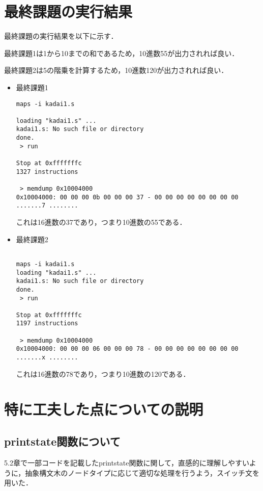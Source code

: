 \documentclass[a4j]{jarticle}
\begin{document}
\section{最終課題の実行結果}
最終課題の実行結果を以下に示す．

最終課題1は1から10までの和であるため，10進数55が出力されれば良い．

最終課題2は5の階乗を計算するため，10進数120が出力されれば良い．

\begin{itemize}

\item 最終課題1
\begin{screen}
\begin{verbatim}
maps -i kadai1.s

loading "kadai1.s" ...
kadai1.s: No such file or directory
done.
 > run

Stop at 0xfffffffc
1327 instructions

 > memdump 0x10004000
0x10004000: 00 00 00 0b 00 00 00 37 - 00 00 00 00 00 00 00 00  .......7 ........
\end{verbatim}
\end{screen}

これは16進数の37であり，つまり10進数の55である．

\newpage
\item 最終課題2
\begin{screen}
\begin{verbatim}

maps -i kadai1.s
loading "kadai1.s" ...
kadai1.s: No such file or directory
done.
 > run

Stop at 0xfffffffc
1197 instructions

 > memdump 0x10004000
0x10004000: 00 00 00 06 00 00 00 78 - 00 00 00 00 00 00 00 00  .......x ........
\end{verbatim}
\end{screen}

これは16進数の78であり，つまり10進数の120である． 

\end{itemize}



\section{特に工夫した点についての説明}
\subsection{printstate関数について}
5.2章で一部コードを記載したprintstate関数に関して，直感的に理解しやすいように，抽象構文木のノードタイプに応じて適切な処理を行うよう，スイッチ文を用いた．
\end{document}
